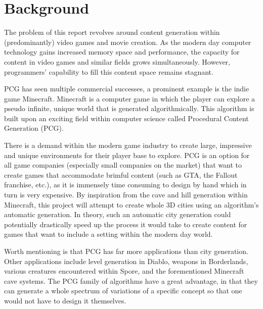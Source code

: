 \section{Background}
The problem of this report revolves around content generation within (predominantly) video games and movie creation. As the modern day computer technology gains increased memory space and performance, the capacity for content in video games and similar fields grows simultaneously. However, programmers' capability to fill this content space remains stagnant.

PCG has seen multiple commercial successes, a prominent example is the indie game Minecraft. Minecraft is a computer game in which the player can explore a pseudo infinite, unique world that is generated algorithmically. This algorithm is built upon an exciting field within computer science called Procedural Content Generation (PCG). 

There is a demand within the modern game industry to create large, impressive and unique environments for their player base to explore. PCG is an option for all game companies (especially small companies on the market) that want to create games that accommodate brimful content (such as GTA, the Fallout franchise, etc.), as it is immensely time consuming to design by hand which in turn is very expensive. By inspiration from the cave and hill generation within Minecraft, this project will attempt to create whole 3D cities using an algorithm's automatic generation. In theory, such an automatic city generation could potentially drastically speed up the process it would take to create content for games that want to include a setting within the modern day world.

Worth mentioning is that PCG has far more applications than city generation. Other applications include level generation in Diablo, weapons in Borderlands, various creatures encountered within Spore, and the forementioned Minecraft cave systems. The PCG family of algorithms have a great advantage, in that they can generate a whole spectrum of variations of a specific concept so that one would not have to design it themselves.
